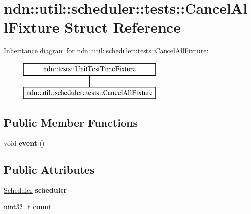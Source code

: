 \hypertarget{structndn_1_1util_1_1scheduler_1_1tests_1_1CancelAllFixture}{}\section{ndn\+:\+:util\+:\+:scheduler\+:\+:tests\+:\+:Cancel\+All\+Fixture Struct Reference}
\label{structndn_1_1util_1_1scheduler_1_1tests_1_1CancelAllFixture}
Inheritance diagram for ndn\+:\+:util\+:\+:scheduler\+:\+:tests\+:\+:Cancel\+All\+Fixture\+:\begin{figure}[H]
\begin{center}
\leavevmode
\includegraphics[height=2.000000cm]{structndn_1_1util_1_1scheduler_1_1tests_1_1CancelAllFixture}
\end{center}
\end{figure}
\subsection*{Public Member Functions}
\begin{DoxyCompactItemize}
\item 
void {\bfseries event} ()\hypertarget{structndn_1_1util_1_1scheduler_1_1tests_1_1CancelAllFixture_aaaef37a6a4478fd22c883fbaf3c708b3}{}\label{structndn_1_1util_1_1scheduler_1_1tests_1_1CancelAllFixture_aaaef37a6a4478fd22c883fbaf3c708b3}

\end{DoxyCompactItemize}
\subsection*{Public Attributes}
\begin{DoxyCompactItemize}
\item 
\hyperlink{classndn_1_1util_1_1scheduler_1_1Scheduler}{Scheduler} {\bfseries scheduler}\hypertarget{structndn_1_1util_1_1scheduler_1_1tests_1_1CancelAllFixture_abd1ff79b1aaa688d211f56481ff6ba38}{}\label{structndn_1_1util_1_1scheduler_1_1tests_1_1CancelAllFixture_abd1ff79b1aaa688d211f56481ff6ba38}

\item 
uint32\+\_\+t {\bfseries count}\hypertarget{structndn_1_1util_1_1scheduler_1_1tests_1_1CancelAllFixture_af374def45b710e52d81b37a45476ba76}{}\label{structndn_1_1util_1_1scheduler_1_1tests_1_1CancelAllFixture_af374def45b710e52d81b37a45476ba76}

\end{DoxyCompactItemize}


